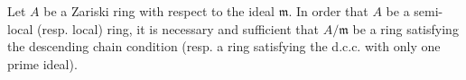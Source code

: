 Let $A$ be a Zariski ring with respect to the ideal $\mathfrak{m}$. In order that $A$ be a semi-local (resp. local) ring, it is necessary and sufficient that $A/\mathfrak{m}$ be a ring satisfying the descending chain condition (resp. a ring satisfying the d.c.c. with only one prime ideal).
